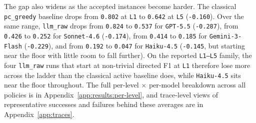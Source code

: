The gap also widens as the accepted instances become harder. The classical \texttt{pc\_greedy} baseline drops from \texttt{0.802} at \texttt{L1} to \texttt{0.642} at \texttt{L5} (\texttt{-0.160}). Over the same range, \texttt{llm\_raw} drops from \texttt{0.824} to \texttt{0.537} for \texttt{GPT-5.5} (\texttt{-0.287}), from \texttt{0.426} to \texttt{0.252} for \texttt{Sonnet-4.6} (\texttt{-0.174}), from \texttt{0.414} to \texttt{0.185} for \texttt{Gemini-3-Flash} (\texttt{-0.229}), and from \texttt{0.192} to \texttt{0.047} for \texttt{Haiku-4.5} (\texttt{-0.145}, but starting near the floor with little room to fall further). On the reported \texttt{L1--L5} family, the four \texttt{llm\_raw} runs that start at non-trivial directed F1 at \texttt{L1} therefore lose more across the ladder than the classical active baseline does, while \texttt{Haiku-4.5} sits near the floor throughout. The full per-level $\times$ per-model breakdown across all policies is in Appendix~\ref{app:results:per-level}, and trace-level views of representative successes and failures behind these averages are in Appendix~\ref{app:traces}.

\FloatBarrier
